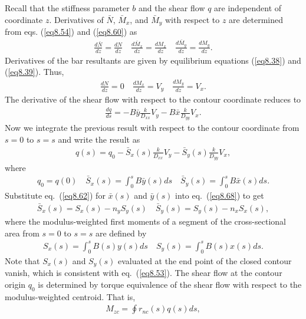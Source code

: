 \documentclass{AeroStructure-ERJohnson}
\begin{document}
\noindent Recall that the stiffness parameter $b$ and the shear flow $q$ are
independent of coordinate $z$. Derivatives of $\bar{N}$,
$\bar{M}_{x}$, and $\bar{M}_{y}$ with respect to $z$ are
determined from eqs. (\ref{eq8.54}) and (\ref{eq8.60}) as
\begin{align}\label{eq8.64}
\frac{d \bar{N}}{d z}=\frac{d N}{d z} \quad \frac{d \bar{M}_{x}}{d
z}=\frac{d M_{x}}{d z} \quad \frac{d \bar{M}_{y}}{d z}=\frac{d
M_{y}}{d z}.
\end{align}
Derivatives of the bar resultants are given by equilibrium
equations (\ref{eq8.38}) and (\ref{eq8.39}). Thus,
\begin{align}\label{eq8.65}
\frac{d N}{d z}=0 \quad \frac{d M_{x}}{d z}=V_{y} \quad \frac{d
M_{y}}{d z}=V_{x}.
\end{align}
The derivative of the shear flow with respect to the contour
coordinate reduces to
\begin{align}\label{eq8.66}
\frac{d q}{d s}=-B \bar{y} \frac{k}{D_{x x}} V_{y}-B \bar{x}
\frac{k}{D_{y y}} V_{x}.
\end{align}
Now we integrate the previous result with respect to the contour
coordinate from $s = 0$ to $s = s$ and write the result as
\begin{align}\label{eq8.67}
q(s)=q_{0}-\bar{S}_{x}(s) \frac{k}{D_{x x}} V_{y}-\bar{S}_{y}(s)
\frac{k}{D_{y y}} V_{x},
\end{align}
where
\begin{align}\label{eq8.68}
q_{0}=q(0) \quad \bar{S}_{x}(s)=\int_{0}^{s} B \bar{y}(s) d s
\quad \bar{S}_{y}(s)=\int_{0}^{s} B \bar{x}(s) d s.
\end{align}
Substitute eq.~(\ref{eq8.62}) for $\bar{x}(s)$ and $\bar{y}(s)$
into eq.~(\ref{eq8.68}) to get
\begin{align}\label{eq8.69}
\bar{S}_{x}(s)=S_{x}(s)-n_{y} S_{y}(s) \quad
\bar{S}_{y}(s)=S_{y}(s)-n_{x} S_{x}(s),
\end{align}
where the modulus-weighted first moments of a segment of the
cross-sectional area from $s = 0$ to $s = s$ are defined by
\begin{align}\label{eq8.70}
S_{x}(s)=\int_{0}^{s} B(s) y(s) d s \quad S_{y}(s)=\int_{0}^{s}
B(s) x(s) d s.
\end{align}
Note that $S_{x}(s)$ and $S_{y}(s)$ evaluated at the end point of
the closed contour vanish, which is consistent with
eq.~(\ref{eq8.53}). The shear flow at the contour origin $q_0$ is
determined by torque equivalence of the shear flow with respect to
the modulus-weighted centroid. That is,
\begin{align}\label{eq8.71}
M_{z c}=\oint r_{n c}(s) q(s) d s,
\end{align}
\end{document}
